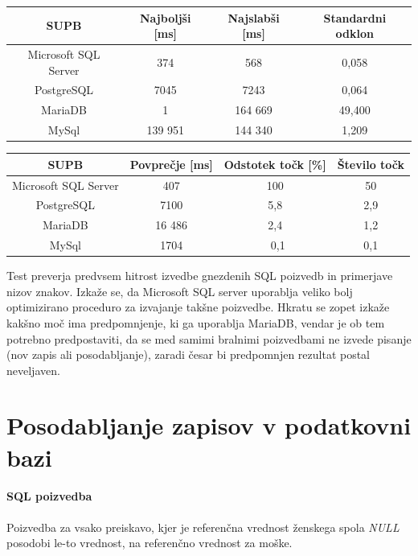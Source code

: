 \documentclass[a4paper,11pt]{report}
\begin{document}
\begin{center}
   \begin{tabular}{||c|c|c|c||}
      \hline
      \textbf{SUPB} & \textbf{Najboljši [ms]} & \textbf{Najslabši [ms]} & \textbf{Standardni odklon}\\
      \hline
      \hline
      Microsoft SQL Server & 374 & 568 & 0,058 \\
      PostgreSQL & 7045 & 7243 & 0,064 \\
      MariaDB & 1 & 164 669 & 49,400 \\
      MySql & 139 951 & 144 340 & 1,209 \\
      \hline
   \end{tabular}
\end{center}

\begin{center}
   \begin{tabular}{||c|c|c|c||}
      \hline
      \textbf{SUPB} & \textbf{Povprečje [ms]} & \textbf{Odstotek točk [\%]} & \textbf{Število točk}\\
      \hline
      \hline
      Microsoft SQL Server & 407 & 100 & 50 \\
      PostgreSQL & 7100 & 5,8 & 2,9\\
      MariaDB & 16 486 & 2,4 & 1,2 \\
      MySql & 1704 & ~0,1 & 0,1 \\
      \hline
   \end{tabular}
\end{center}

Test preverja predvsem hitrost izvedbe gnezdenih SQL poizvedb in primerjave nizov znakov. 
Izkaže se, da Microsoft SQL server uporablja veliko bolj optimizirano proceduro za izvajanje takšne poizvedbe. Hkratu
se zopet izkaže kakšno moč ima predpomnjenje, ki ga uporablja MariaDB, vendar je ob tem potrebno predpostaviti, da se
med samimi bralnimi poizvedbami ne izvede pisanje (nov zapis ali posodabljanje), zaradi česar bi predpomnjen rezultat postal neveljaven.

\section{Posodabljanje zapisov v podatkovni bazi}

\paragraph{SQL poizvedba}
Poizvedba za vsako preiskavo, kjer je referenčna vrednost ženskega spola \textit{NULL} posodobi le-to vrednost, na referenčno vrednost za moške.
\end{document}

